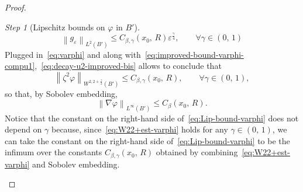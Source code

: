 \documentclass[a4paper, 11pt, twoside, leqno]{article}
\theoremstyle{definition}              %
\theoremstyle{remark}                  %
\newtheorem{step}{Step}
\newcommand{\norm}[1]{\left\| #1 \right\|}                          %
\newcommand{\eps}{\varepsilon}
\begin{document}
\begin{proof}
\begin{step}[Lipschitz bounds on $\varphi$ in $B'$]
\begin{equation}
        \norm{g_\eps}_{L^2(B')} \leq C_{\beta,\gamma}(x_0,\,R) \eps^\frac{\gamma}{4}, 
        \qquad \forall \gamma \in (0,\,1)
    \end{equation}
    Plugged in~\eqref{eq:varphi} and along 
    with~\eqref{eq:improved-bound-varphi-compu1},~\eqref{eq:decay-u2-improved-bis} 
    allows to conclude that 
    \begin{equation}\label{eq:W22+est-varphi}
        \norm{\zeta^2 \varphi}_{W^{2,2+\frac{\gamma}{2}}(B')} \leq C_{\beta,\gamma}(x_0,\,R), 
        \qquad \forall \gamma \in (0,\,1),
    \end{equation}
    so that, by Sobolev embedding, 
    \begin{equation}\label{eq:Lip-bound-varphi}
        \norm{\nabla \varphi}_{L^\infty(B')} \leq C_\beta(x_0,\,R).
    \end{equation}
    Notice that the constant on the right-hand side of~\eqref{eq:Lip-bound-varphi} 
    does not depend on $\gamma$ because, since~\eqref{eq:W22+est-varphi} 
    holds for any $\gamma \in (0,\,1)$, we can take the constant on the 
    right-hand side of~\eqref{eq:Lip-bound-varphi} to be the infimum 
    over the constants $C_{\beta,\gamma}(x_0,\,R)$ obtained by 
    combining~\eqref{eq:W22+est-varphi} and Sobolev embedding.
\end{step}


\end{proof}
\end{document}
